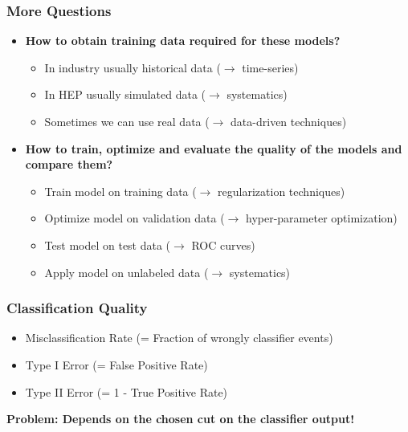 \begin{frame}
    \frametitle{More Questions}
    \begin{center}
		\begin{itemize}
      \item \textbf{How to obtain training data required for these models?}
			\begin{itemize}
				\item In industry usually historical data ($\rightarrow$ time-series)
				\item In HEP usually simulated data ($\rightarrow$ systematics)	
				\item Sometimes we can use real data ($\rightarrow$ data-driven techniques)
			\end{itemize}
    \item \textbf{How to train, optimize and evaluate the quality of the models and compare them?}
			\begin{itemize}
				\item Train model on training data ($\rightarrow$ regularization techniques)
				\item Optimize model on validation data ($\rightarrow$ hyper-parameter optimization)
				\item Test model on test data ($\rightarrow$ ROC curves)
				\item Apply model on unlabeled data ($\rightarrow$ systematics)
			\end{itemize}
		\end{itemize}
    \end{center}
\end{frame}

\begin{frame}
    \frametitle{Classification Quality}

    \begin{center}

      \begin{itemize}
        \item Misclassification Rate (= Fraction of wrongly classifier events)
        \item Type I Error (= False Positive Rate)
        \item Type II Error (= 1 - True Positive Rate)
      \end{itemize}
      \vspace{1em}
        \textbf{Problem: Depends on the chosen cut on the classifier output!}
    \end{center}
\end{frame}

